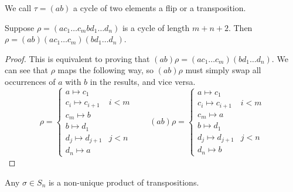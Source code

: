 \begin{definition}
    We call \(\tau = (ab)\) a cycle of two elements
    a flip or a transposition.
\end{definition}
\begin{lemma}\label{lem:breaking-cycles-sn}
    Suppose \(\rho = (a c_1 \hdots c_m b d_1 \hdots d_n)\)
    is a cycle of length \(m+n+2\).
    Then \(\rho = (ab)(a c_1 \hdots c_m)(b d_1 \hdots d_n)\).
\end{lemma}
\begin{proof}
    This is equivalent to proving that
    \((ab)\rho = (a c_1 \hdots c_m)(b d_1 \hdots d_n)\).
    We can see that \(\rho\) maps the following way,
    so \((ab)\rho\) must simply swap all occurrences of \(a\) with \(b\)
    in the results, and vice versa.
    \begin{equation*}
        \rho = \begin{cases}
            a \mapsto c_1 \\
            c_i \mapsto c_{i+1} & i < m \\
            c_m \mapsto b \\
            b \mapsto d_1 \\
            d_j \mapsto d_{j+1} & j < n \\
            d_n \mapsto a
        \end{cases} \qquad
        (ab)\rho = \begin{cases}
            a \mapsto c_1 \\
            c_i \mapsto c_{i+1} & i < m \\
            c_m \mapsto a \\
            b \mapsto d_1 \\
            d_j \mapsto d_{j+1} & j < n \\
            d_n \mapsto b
        \end{cases}
    \end{equation*}
\end{proof}
\begin{theorem}\label{thm:sn-product-transpositions}
    Any \(\sigma \in S_n\) is a non-unique product of transpositions.
\end{theorem}
